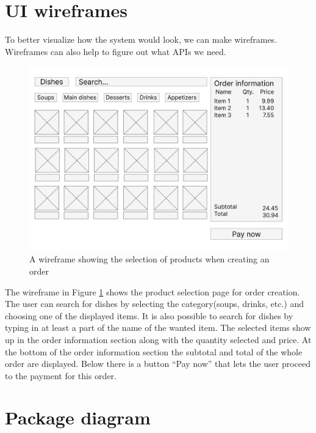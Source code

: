 \documentclass[11pt,a4paper,pdftex]{article}
\begin{document}
\section{UI wireframes}
To better visualize how the system would look, we can make wireframes. Wireframes can also help to figure out what APIs we need.

\begin{figure}[H]
    \centering
    \includegraphics[width=1\linewidth]{ProductSelection.png}
    \caption{A wireframe showing the selection of products when creating an order}
    \label{fig:wireframe_product_selection}
\end{figure}

The wireframe in Figure \ref{fig:wireframe_product_selection} shows the product selection page for order creation. The user can search for dishes by selecting the category(soups, drinks, etc.) and choosing one of the displayed items. It is also possible to search for dishes by typing in at least a part of the name of the wanted item. The selected items show up in the order information section along with the quantity selected and price. At the bottom of the order information section the subtotal and total of the whole order are displayed. Below there is a button \enquote{Pay now} that lets the user proceed to the payment for this order.


\section{Package diagram}
\end{document}

